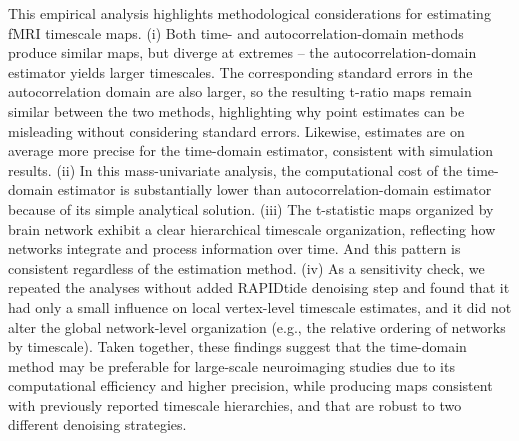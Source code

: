 \documentclass[docs/main.tex]{subfiles}
\begin{document}
This empirical analysis highlights methodological considerations for estimating fMRI timescale maps. (i) Both time- and autocorrelation-domain methods produce similar maps, but diverge at extremes -- the autocorrelation-domain estimator yields larger timescales. The corresponding standard errors in the autocorrelation domain are also larger, so the resulting t-ratio maps remain similar between the two methods, highlighting why point estimates can be misleading without considering standard errors.  Likewise, estimates are on average more precise for the time-domain estimator, consistent with simulation results.  (ii) In this mass-univariate analysis, the computational cost of the time-domain estimator is substantially lower than autocorrelation-domain estimator because of its simple analytical solution. (iii) The t-statistic maps organized by brain network exhibit a clear hierarchical timescale organization, reflecting how networks integrate and process information over time. And this pattern is consistent regardless of the estimation method. (iv) As a sensitivity check, we repeated the analyses without added RAPIDtide denoising step and found that it had only a small influence on local vertex-level timescale estimates, and it did not alter the global network-level organization (e.g., the relative ordering of networks by timescale). Taken together, these findings suggest that the time-domain method may be preferable for large-scale neuroimaging studies due to its computational efficiency and higher precision, while producing maps consistent with previously reported timescale hierarchies, and that are robust to two different denoising strategies.
\end{document}
